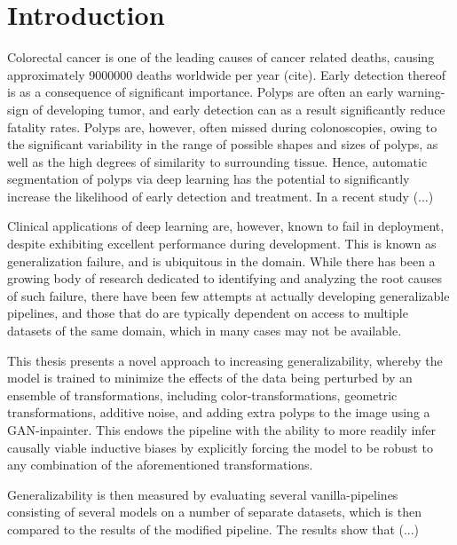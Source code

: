     \chapter*{Introduction}
    \setcounter{chapter}{1}
    Colorectal cancer is one of the leading causes of cancer related deaths, causing approximately 9000000 deaths worldwide per year (cite). Early detection thereof is as a consequence of significant importance. Polyps are often an early warning-sign of developing tumor, and early detection can as a result significantly reduce fatality rates. Polyps are, however, often missed during colonoscopies, owing to the significant variability in the range of possible shapes and sizes of polyps, as well as the high degrees of similarity to surrounding tissue. Hence, automatic segmentation of polyps via deep learning has the potential to significantly increase the likelihood of early detection and treatment. In a recent study (...) %
    
    Clinical applications of deep learning are, however, known to fail in deployment, despite exhibiting excellent performance during development. This is known as generalization failure, and is ubiquitous in the domain. While there has been a growing body of research dedicated to identifying and analyzing the root causes of such failure, there have been few attempts at actually developing generalizable pipelines, and those that do are typically dependent on access to multiple datasets of the same domain, which in many cases may not be available.
    
    This thesis presents a novel approach to increasing generalizability, whereby the model is trained to minimize the effects of the data being perturbed by an ensemble of transformations, including color-transformations, geometric transformations, additive noise, and adding extra polyps to the image using a GAN-inpainter. This endows the pipeline with the ability to more readily infer causally viable inductive biases by explicitly forcing the model to be robust to any combination of the aforementioned transformations. 
    
    Generalizability is then measured by evaluating several vanilla-pipelines consisting of several models on a number of separate datasets, which is then compared to the results of the modified pipeline. The results show that (...)
    
   

